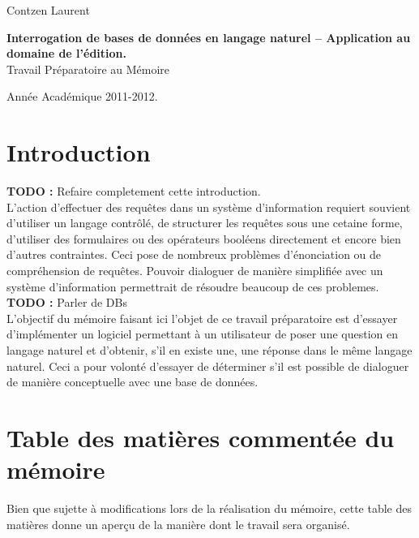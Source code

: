 \documentclass[11pt]{article}
\author{Contzen Laurent}
\begin{document}
\begin{titlepage}  
  \begin{flushleft}
    Contzen Laurent
  \end{flushleft}
  \begin{center}
    \vspace{82mm}\LARGE{\textbf{Interrogation de bases de données en langage naturel – Application au domaine de l’édition.} \\    
      Travail Préparatoire au Mémoire}
  \end{center}
  \begin{flushright}
    \vspace{92mm}
    Année Académique 2011-2012.             
  \end{flushright}
\end{titlepage}

\tableofcontents
\newpage

\section{Introduction}
\colorbox{BrickRed}{\textbf{TODO : } Refaire completement cette introduction.} \\ 
L'action d'effectuer des requêtes dans un système d'information requiert souvient d'utiliser un langage contrôlé, de structurer les requêtes sous une cetaine forme, d'utiliser des formulaires ou des opérateurs booléens directement et encore bien d'autres contraintes.
Ceci pose de nombreux problèmes d'énonciation ou de compréhension de requêtes.
Pouvoir dialoguer de manière simplifiée avec un système d'information permettrait de résoudre beaucoup de ces problemes. \colorbox{BrickRed}{\textbf{TODO : } Parler de DBs} \\
L'objectif du mémoire faisant ici l'objet de ce travail préparatoire est d'essayer d'implémenter un logiciel permettant à un utilisateur de poser une question en langage naturel et d'obtenir, s'il en existe une, une réponse dans le même langage naturel.
Ceci a pour volonté d'essayer de déterminer s'il est possible de dialoguer de manière conceptuelle avec une base de données.

\section{Table des matières commentée du mémoire}
Bien que sujette à modifications lors de la réalisation du mémoire, cette table des matières donne un aperçu de la manière dont le travail sera organisé.
\end{document}
